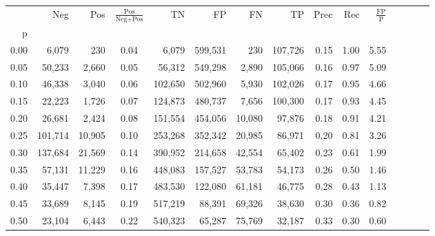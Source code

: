 \begin{tabular}{rrrcrrrrrrrrrrr}
\toprule
{} &      Neg &     Pos & $\frac{\text{Pos}}{\text{Neg}+\text{Pos}}$ &       TN &       FP &       FN &       TP &  Prec &   Rec & $\frac{\text{FP}}{\text{P}}$ \\
p    &          &         &                                            &          &          &          &          &       &       &                              \\
\midrule
0.00 &    6,079 &     230 &                                       0.04 &    6,079 &  599,531 &      230 &  107,726 &  0.15 &  1.00 &                         5.55 \\
0.05 &   50,233 &   2,660 &                                       0.05 &   56,312 &  549,298 &    2,890 &  105,066 &  0.16 &  0.97 &                         5.09 \\
0.10 &   46,338 &   3,040 &                                       0.06 &  102,650 &  502,960 &    5,930 &  102,026 &  0.17 &  0.95 &                         4.66 \\
0.15 &   22,223 &   1,726 &                                       0.07 &  124,873 &  480,737 &    7,656 &  100,300 &  0.17 &  0.93 &                         4.45 \\
0.20 &   26,681 &   2,424 &                                       0.08 &  151,554 &  454,056 &   10,080 &   97,876 &  0.18 &  0.91 &                         4.21 \\
0.25 &  101,714 &  10,905 &                                       0.10 &  253,268 &  352,342 &   20,985 &   86,971 &  0.20 &  0.81 &                         3.26 \\
0.30 &  137,684 &  21,569 &                                       0.14 &  390,952 &  214,658 &   42,554 &   65,402 &  0.23 &  0.61 &                         1.99 \\
0.35 &   57,131 &  11,229 &                                       0.16 &  448,083 &  157,527 &   53,783 &   54,173 &  0.26 &  0.50 &                         1.46 \\
0.40 &   35,447 &   7,398 &                                       0.17 &  483,530 &  122,080 &   61,181 &   46,775 &  0.28 &  0.43 &                         1.13 \\
0.45 &   33,689 &   8,145 &                                       0.19 &  517,219 &   88,391 &   69,326 &   38,630 &  0.30 &  0.36 &                         0.82 \\
0.50 &   23,104 &   6,443 &                                       0.22 &  540,323 &   65,287 &   75,769 &   32,187 &  0.33 &  0.30 &                         0.60 \\

\end{tabular}
